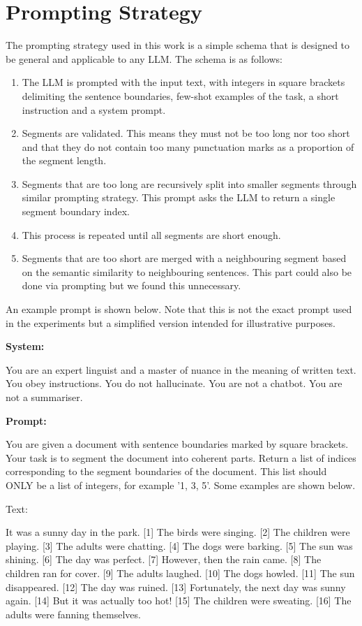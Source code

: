 \section{Prompting Strategy}\label{Prompting Strategy}

The prompting strategy used in this work is a simple schema that is designed to be general and applicable to any LLM. The schema is as follows:

\begin{enumerate}
    \item The LLM is prompted with the input text, with integers in square brackets delimiting the sentence boundaries, few-shot examples of the task, a short instruction and a system prompt.
    \item Segments are validated. This means they must not be too long nor too short and that they do not contain too many punctuation marks as a proportion of the segment length.
    \item Segments that are too long are recursively split into smaller segments through similar prompting strategy. This prompt asks the LLM to return a single segment boundary index.
    \item This process is repeated until all segments are short enough.
    \item Segments that are too short are merged with a neighbouring segment based on the semantic similarity to neighbouring sentences. This part could also be done via prompting but we found this unnecessary.
\end{enumerate}

An example prompt is shown below. Note that this is not the exact prompt used in the experiments but a simplified version intended for illustrative purposes.

\textbf{System:}

You are an expert linguist and a master of nuance in the meaning of written text. You obey instructions. You do not hallucinate. You are not a chatbot. You are not a summariser.

\textbf{Prompt:} 

You are given a document with sentence boundaries marked by square brackets. Your task is to segment the document into coherent parts. Return a list of indices corresponding to the segment boundaries of the document. This list should ONLY be a list of integers, for example '1, 3, 5'. Some examples are shown below.

Text: 

It was a sunny day in the park. [1] The birds were singing. [2] The children were playing. [3] The adults were chatting. [4] The dogs were barking. [5] The sun was shining. [6] The day was perfect. [7] However, then the rain came. [8] The children ran for cover. [9] The adults laughed. [10] The dogs howled. [11] The sun disappeared. [12] The day was ruined. [13] Fortunately, the next day was sunny again. [14] But it was actually too hot! [15] The children were sweating. [16] The adults were fanning themselves.

